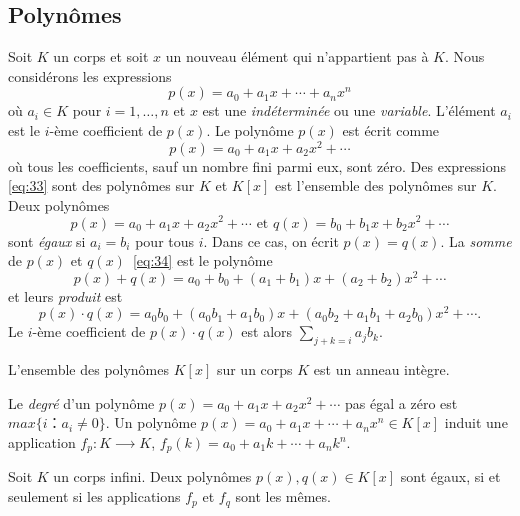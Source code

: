 \subsection{Polynômes}
\label{sec:polynomes}
Soit $K$ un corps et soit $x$ un nouveau élément qui n'appartient pas à $K$. Nous considérons les expressions
\begin{equation}
  \label{eq:33}
  p(x) = a_0 + a_1 x + \cdots + a_n x^n
\end{equation}
où $a_i ∈K$ pour $i=1,\dots,n$ et $x$ est une \emph{indéterminée} ou une  \emph{variable}.  L'élément $a_i$ est le $i$-ème coefficient de $p(x)$. Le polynôme $p(x)$ est écrit comme
\begin{displaymath}
  p(x) = a_0 + a_1x + a_2x^2 + \cdots
\end{displaymath}
où tous les  coefficients, sauf un nombre fini parmi eux, sont zéro.
Des expressions \eqref{eq:33} sont des polynômes sur $K$  et $K[x]$ est l'ensemble des polynômes sur $K$. Deux polynômes
\begin{equation}
  \label{eq:34}
  p(x) = a_0 + a_1x + a_2x^2 + \cdots \text{ et } q(x) = b_0 + b_1x + b_2x^2 + \cdots
  \end{equation}
  sont \emph{égaux} si $a_i  =b_i$ pour tous $i$. Dans ce cas, on écrit $p(x) = q(x)$.
La \emph{somme} de $p(x)$ et $q(x)$~\eqref{eq:34} est le polynôme
\begin{displaymath}
  p(x) + q(x)  = a_0+b_0 + (a_1+b_1)x + (a_2+b_2)x^2 + \cdots
\end{displaymath}
et leurs \emph{produit} est
\begin{displaymath}
  p(x) ⋅q(x) = a_0 b_0 + (a_0b_1 +a_1b_0) x + (a_0b_2+ a_1b_1 + a_2b_0)x^2 + \cdots .
\end{displaymath}
Le $i$-ème coefficient de $p(x)⋅q(x)$ est alors  $∑_{j+k=i}a_jb_k$.

\begin{theorem}
  \label{thr:43}
  L'ensemble des polynômes $K[x]$ sur un corps $K$ est un anneau intègre.
\end{theorem}

Le \emph{degré} d'un polynôme $p(x) = a_0 + a_1x + a_2x^2 + \cdots$ pas égal a zéro est $max\{i： a_i ≠0\}$. Un polynôme $p(x) = a_0 + a_1 x + \cdots + a_n x^n ∈ K[x]$ induit une application $f_p:  K ⟶ K$, $f_p(k) = a_0+ a_1 k+ \cdots + a_n k^n$.

\begin{theorem}
  \label{thr:42}
  Soit $K$ un corps infini. Deux polynômes $p(x),q(x) ∈ K[x]$ sont égaux, si et seulement si les applications $f_p$ et $f_q$ sont les mêmes.
\end{theorem}

